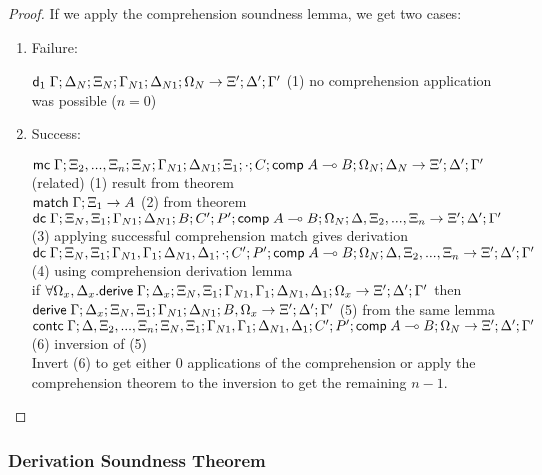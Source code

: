 \begin{proof}
   If we apply the comprehension soundness lemma, we get two cases:
   
   \begin{enumerate}
      \item Failure:
      
      $\mathsf{d}_1 \; \Gamma; \Delta_N; \Xi_N; \Gamma_{N1}; \Delta_{N1}; \Omega_N \rightarrow \Xi'; \Delta'; \Gamma'$ \hfill (1) no comprehension application was possible ($n = 0$)\\
      
      \item Success:
      
      $\mathsf{mc} \; \Gamma; \Xi_2, ..., \Xi_n; \Xi_N; \Gamma_{N1}; \Delta_{N1}; \Xi_1; \cdot; C; \mathsf{comp} \; A \multimap B; \Omega_N; \Delta_N \rightarrow \Xi'; \Delta'; \Gamma'$ (related) \hfill (1) result from theorem \\
      $\mathsf{match} \; \Gamma; \Xi_1 \rightarrow A$ \hfill (2) from theorem \\
      $\mathsf{dc} \; \Gamma; \Xi_N, \Xi_1; \Gamma_{N1}; \Delta_{N1}; B; C'; P'; \mathsf{comp} \; A \multimap B; \Omega_N; \Delta, \Xi_2, ..., \Xi_n \rightarrow \Xi'; \Delta'; \Gamma'$ \hfill (3) applying successful comprehension match gives derivation \\
      $\mathsf{dc} \; \Gamma; \Xi_N, \Xi_1; \Gamma_{N1}, \Gamma_1; \Delta_{N1}, \Delta_1; \cdot; C'; P'; \mathsf{comp} \; A \multimap B; \Omega_N; \Delta, \Xi_2, ..., \Xi_n \rightarrow \Xi'; \Delta'; \Gamma'$ \hfill (4) using comprehension derivation lemma \\
      if $\forall \Omega_x, \Delta_x. \mathsf{derive} \; \Gamma; \Delta_x; \Xi_N, \Xi_1; \Gamma_{N1}, \Gamma_1; \Delta_{N1}, \Delta_1; \Omega_x \rightarrow \Xi'; \Delta'; \Gamma'$ then $\mathsf{derive} \; \Gamma; \Delta_x; \Xi_N, \Xi_1; \Gamma_{N1}; \Delta_{N1}; B, \Omega_x \rightarrow \Xi'; \Delta'; \Gamma'$ \hfill (5) from the same lemma \\
      $\mathsf{contc} \; \Gamma; \Delta, \Xi_2, ..., \Xi_n; \Xi_N, \Xi_1; \Gamma_{N1}, \Gamma_1; \Delta_{N1}, \Delta_1; C'; P'; \mathsf{comp} \; A \multimap B; \Omega_N \rightarrow \Xi'; \Delta'; \Gamma'$ \hfill (6) inversion of (5) \\
      
      Invert (6) to get either $0$ applications of the comprehension or apply the comprehension theorem to the inversion to get the remaining $n-1$. 
   \end{enumerate}
\end{proof}

\subsubsection{Derivation Soundness Theorem}

